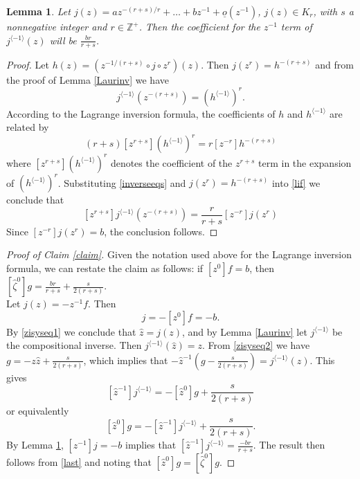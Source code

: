 \documentclass[11pt]{amsart}
\theoremstyle{plain}
\newtheorem{lemma}[theorem]{Lemma}
\theoremstyle{definition}
\theoremstyle{remark}
\def\d{\displaystyle}
\def\z{\hat{\zeta}}
\def\comp{\circ}
\begin{document}
\begin{lemma}\label{fgcoeffslemma}
	Let $\d{j(z)=az^{-(r+s)/r}+\dots+bz^{-1}+\underline{o}(z^{-1})}$, $j(z)\in K_r$, with $s$ a nonnegative integer and $r\in\mathbb{Z}^+$.  Then the coefficient for the $z^{-1}$ term of $j^{\langle -1 \rangle}(z)$ will be $\frac{br}{r+s}$.
\end{lemma}

\begin{proof}
	  Let $h(z) = (z^{-1/(r+s)}\comp j\comp z^r)(z)$.  Then $j(z^r)=h^{-(r+s)}$ and from the proof of Lemma \ref{Laurinv} we have
\begin{equation}\label{inverseeqs}
	 j^{\langle -1 \rangle}(z^{-(r+s)})=(h^{\langle -1 \rangle})^r.
\end{equation}
According to the Lagrange inversion formula, the coefficients of $h$ and $h^{\langle -1 \rangle}$ are related by
\begin{equation}\label{lif}
	(r+s)[z^{r+s}](h^{\langle -1 \rangle})^r=r[z^{-r}]h^{-(r+s)}
\end{equation}
where $[z^{r+s}](h^{\langle -1 \rangle})^r$ denotes the coefficient of the $z^{r+s}$ term in the expansion of $(h^{\langle -1 \rangle})^r$.  Substituting \eqref{inverseeqs} and $j(z^r)=h^{-(r+s)}$ into \eqref{lif} we conclude that
\begin{equation}\label{lifconc}
	[z^{r+s}]j^{\langle -1 \rangle}(z^{-(r+s)})=\frac{r}{r+s}[z^{-r}]j(z^r)
\end{equation}Since $[z^{-r}]j(z^r)=b$, the conclusion follows.
\end{proof}

\begin{proof}[Proof of Claim \ref{claim}]
    Given the notation used above for the Lagrange inversion formula, we can restate the claim as follows: if $[z^0]f=b$, then $[\z^0]g=\frac{br}{r+s}+\frac{s}{2(r+s)}$.\\
      Let $j(z)=-z^{-1}f$.  Then
    \begin{equation*}
    [z^{-1}]j=-[z^0]f=-b.
    \end{equation*}
      By \eqref{zisyseq1} we conclude that $\hat{z}=j(z)$, and by Lemma \ref{Laurinv} let $j^{\langle -1 \rangle}$ be the compositional inverse.  Then $j^{\langle -1 \rangle}(\hat{z})=z$.  From \eqref{zisyseq2} we have $g=-z\hat{z}+\frac{s}{2(r+s)}$, which implies that $-\hat{z}^{-1}(g-\frac{s}{2(r+s)})=j^{\langle -1 \rangle}(\hat{z})$.  This gives
\[ [\hat{z}^{-1}]j^{\langle -1 \rangle}=-[\hat{z}^0]g+\frac{s}{2(r+s)}
\]
or equivalently
      \begin{equation}\label{last}
    [\hat{z}^0]g=-[\hat{z}^{-1}]j^{\langle -1 \rangle}+\frac{s}{2(r+s)}.
    \end{equation}
    By Lemma \ref{fgcoeffslemma}, $[z^{-1}]j=-b$ implies that $[\hat{z}^{-1}]j^{\langle -1 \rangle}=\frac{-br}{r+s}$.  The result then follows from \eqref{last} and noting that $[\hat{z}^0]g=[\z^0]g$.
\end{proof}
\end{document}
